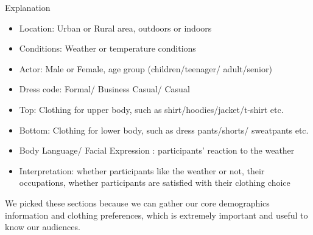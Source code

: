 \documentclass{sigchi}
\begin{document}
Explanation
\begin{itemize}
    \item Location: Urban or Rural area, outdoors or indoors
    \item Conditions: Weather or temperature conditions
    \item Actor: Male or Female, age group (children/teenager/ adult/senior)
    \item Dress code: Formal/ Business Casual/ Casual
    \item Top: Clothing for upper body, such as shirt/hoodies/jacket/t-shirt etc.
    \item Bottom: Clothing for lower body, such as dress pants/shorts/ sweatpants etc.
    \item Body Language/ Facial Expression : participants' reaction to the weather
    \item Interpretation: whether participants like the weather or not, their occupations, whether participants are satisfied with their clothing choice
\end{itemize}

We picked these sections because we can gather our core demographics information and clothing preferences, which is extremely important and useful to know our audiences.
\end{document}
